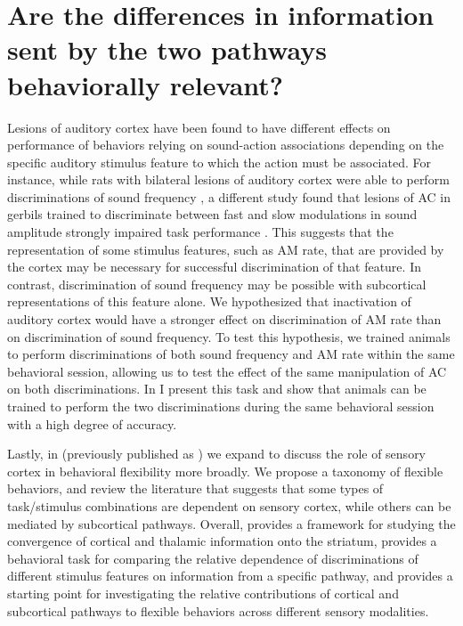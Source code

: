 \section{Are the differences in information sent by the two pathways behaviorally relevant?}
Lesions of auditory cortex have been found to have different effects on performance of behaviors relying on sound-action associations depending on the specific auditory stimulus feature to which the action must be associated.
%
For instance, while rats with bilateral lesions of auditory cortex were able to perform discriminations of sound frequency \citep{Gimenez2015}, a different study found that lesions of AC in gerbils trained to discriminate between fast and slow modulations in sound amplitude strongly impaired task performance \citep{Deutscher2006}.
%
This suggests that the representation of some stimulus features, such as AM rate, that are provided by the cortex may be necessary for successful discrimination of that feature.
%
In contrast, discrimination of sound frequency may be possible with subcortical representations of this feature alone.
%
We hypothesized that inactivation of auditory cortex would have a stronger effect on discrimination of AM rate than on discrimination of sound frequency.
%
To test this hypothesis, we trained animals to perform discriminations of both sound frequency and AM rate within the same behavioral session, allowing us to test the effect of the same manipulation of AC on both discriminations.
In \ch{\Amod} I present this task and show that animals can be trained to perform the two discriminations during the same behavioral session with a high degree of accuracy.
%

Lastly, in \ch{\Rev} (previously published as \citet{Guo2017}) we expand to discuss the role of sensory cortex in behavioral flexibility more broadly.
%
We propose a taxonomy of flexible behaviors, and review the literature that suggests that some types of task/stimulus combinations are dependent on sensory cortex, while others can be mediated by subcortical pathways.
%
Overall, \ch{\Thstr} provides a framework for studying the convergence of cortical and thalamic information onto the striatum, \ch{\Amod} provides a behavioral task for comparing the relative dependence of discriminations of different stimulus features on information from a specific pathway, and \ch{\Rev} provides a starting point for investigating the relative contributions of cortical and subcortical pathways to flexible behaviors across different sensory modalities. 

